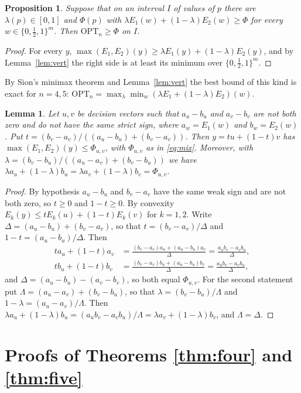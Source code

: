 \documentclass[11pt]{article}
\newtheorem{lemma}[theorem]{Lemma}
\newtheorem{proposition}[theorem]{Proposition}
\newcommand{\OPT}{\mathrm{OPT}}
\newcommand{\h}{\tfrac12}
\begin{document}
\begin{proposition}\label{prop:lower}
Suppose that on an interval $I$ of values of $p$ there are $\lambda(p)\in[0,1]$ and $\Phi(p)$ with $\lambda E_1(w)+(1-\lambda)E_2(w)\ge\Phi$ for every $w\in\{0,\h,1\}^m$. Then $\OPT_n\ge\Phi$ on $I$.
\end{proposition}

\begin{proof}
For every $y$, $\max(E_1,E_2)(y)\ge\lambda E_1(y)+(1-\lambda)E_2(y)$, and by Lemma~\ref{lem:vert} the right side is at least its minimum over $\{0,\h,1\}^m$.
\end{proof}

By Sion's minimax theorem \cite{Sion} and Lemma~\ref{lem:vert} the best bound of this kind is exact for $n=4,5$: $\OPT_n=\max_\lambda\min_w(\lambda E_1+(1-\lambda)E_2)(w)$.

\begin{lemma}\label{lem:mix}
Let $u,v$ be decision vectors such that $a_u-b_u$ and $a_v-b_v$ are not both zero and do not have the same strict sign, where $a_w=E_1(w)$ and $b_w=E_2(w)$. Put $t=(b_v-a_v)/((a_u-b_u)+(b_v-a_v))$. Then $y=tu+(1-t)v$ has $\max(E_1,E_2)(y)\le\Phi_{u,v}$, with $\Phi_{u,v}$ as in \eqref{eq:mix}. Moreover, with $\lambda=(b_v-b_u)/((a_u-a_v)+(b_v-b_u))$ we have $\lambda a_u+(1-\lambda)b_u=\lambda a_v+(1-\lambda)b_v=\Phi_{u,v}$.
\end{lemma}

\begin{proof}
By hypothesis $a_u-b_u$ and $b_v-a_v$ have the same weak sign and are not both zero, so $t\ge0$ and $1-t\ge0$. By convexity $E_k(y)\le tE_k(u)+(1-t)E_k(v)$ for $k=1,2$. Write $\Delta=(a_u-b_u)+(b_v-a_v)$, so that $t=(b_v-a_v)/\Delta$ and $1-t=(a_u-b_u)/\Delta$. Then
\begin{align*}
ta_u+(1-t)a_v&=\frac{(b_v-a_v)a_u+(a_u-b_u)a_v}{\Delta}=\frac{a_ub_v-a_vb_u}{\Delta},\\
tb_u+(1-t)b_v&=\frac{(b_v-a_v)b_u+(a_u-b_u)b_v}{\Delta}=\frac{a_ub_v-a_vb_u}{\Delta},
\end{align*}
and $\Delta=(a_u-b_u)-(a_v-b_v)$, so both equal $\Phi_{u,v}$. For the second statement put $\Lambda=(a_u-a_v)+(b_v-b_u)$, so that $\lambda=(b_v-b_u)/\Lambda$ and $1-\lambda=(a_u-a_v)/\Lambda$. Then $\lambda a_u+(1-\lambda)b_u=(a_ub_v-a_vb_u)/\Lambda=\lambda a_v+(1-\lambda)b_v$, and $\Lambda=\Delta$.
\end{proof}

\section{Proofs of Theorems \ref{thm:four} and \ref{thm:five}}
\end{document}
